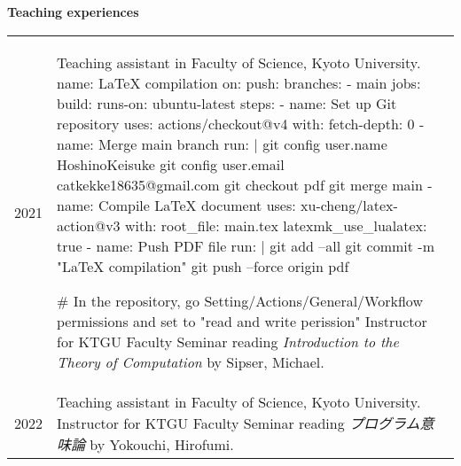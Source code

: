 \documentclass[a4paper,dvipsnames,11pt,backend=luatex]{article} %
\newcommand*{\cvsection}[1]{%
  \vspace{1.2\baselineskip}%
  {\raggedright          %
   \bfseries\large       %
   #1\par}               %
  \vspace{0.4\baselineskip}%
}
\begin{document}
\pagebreak
\cvsection{Teaching experiences}
\begin{tabularx}{\textwidth}{@{}lp{140mm}}
  2021
  &
  Teaching assistant in Faculty of Science, Kyoto University.
name: LaTeX compilation
on:
  push:
    branches:
      - main
jobs:
  build:
    runs-on: ubuntu-latest
    steps:
      - name: Set up Git repository
        uses: actions/checkout@v4
        with:
          fetch-depth: 0
      - name: Merge main branch
        run: |
          git config user.name HoshinoKeisuke
          git config user.email catkekke18635@gmail.com
          git checkout pdf
          git merge main
      - name: Compile LaTeX document
        uses: xu-cheng/latex-action@v3
        with:
          root_file:
            main.tex
          latexmk_use_lualatex: true
      - name: Push PDF file
        run: |
          git add --all
          git commit -m "LaTeX compilation"
          git push --force origin pdf

# In the repository, go Setting/Actions/General/Workflow permissions and set to "read and write perission"
  Instructor for KTGU Faculty Seminar reading \textit{Introduction to the Theory of Computation} by Sipser, Michael.
  \\
  2022
  &
  Teaching assistant in Faculty of Science, Kyoto University.
  Instructor for KTGU Faculty Seminar reading \textit{プログラム意味論} by Yokouchi, Hirofumi.
\end{tabularx}
\end{document}

